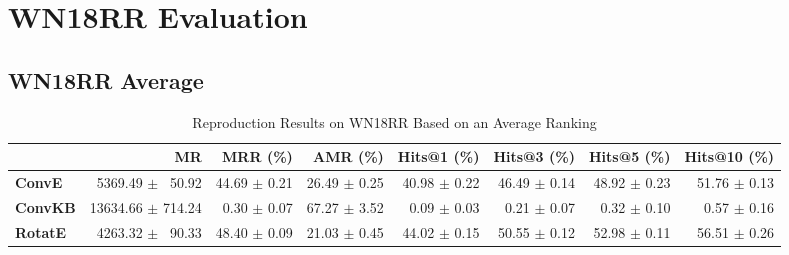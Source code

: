 \documentclass[journal]{IEEEtran}
\begin{document}
\begin{table*}

    \end{table*}

\section{WN18RR Evaluation}
\subsection{WN18RR Average}
\begin{table*}
    \caption{Reproduction Results on WN18RR Based on an Average Ranking}
    \label{tab:wn18rr_full_results_average_ranking}
    \centering
    \begin{tabular}{lrrrrrrr}
\toprule
{} &                 MR &      MRR (\%) &      AMR (\%) &   Hits@1 (\%) &   Hits@3 (\%) &   Hits@5 (\%) &  Hits@10 (\%) \\
\midrule
\textbf{ConvE } &  $\phantom{5}$5369.49 $\pm$ $\phantom{5}$50.92 &  44.69 $\pm$ 0.21 &  26.49 $\pm$ 0.25 &  40.98 $\pm$ 0.22 &  46.49 $\pm$ 0.14 &  48.92 $\pm$ 0.23 &  51.76 $\pm$ 0.13 \\
\textbf{ConvKB} &  13634.66 $\pm$ 714.24 &  $\phantom{5}$0.30 $\pm$ 0.07 &  67.27 $\pm$ 3.52 &  $\phantom{5}$0.09 $\pm$ 0.03 &  $\phantom{5}$0.21 $\pm$ 0.07 &  $\phantom{5}$0.32 $\pm$ 0.10 &  $\phantom{5}$0.57 $\pm$ 0.16 \\
\textbf{RotatE} &  $\phantom{5}$4263.32 $\pm$ $\phantom{5}$90.33 &  48.40 $\pm$ 0.09 &  21.03 $\pm$ 0.45 &  44.02 $\pm$ 0.15 &  50.55 $\pm$ 0.12 &  52.98 $\pm$ 0.11 &  56.51 $\pm$ 0.26 \\
\bottomrule
\end{tabular}

\end{table*}
\end{document}
